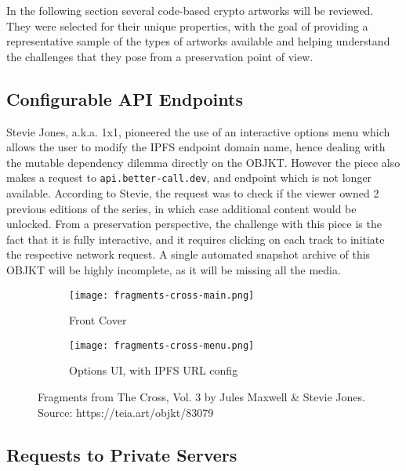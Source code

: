 In the following section several code-based crypto artworks will be reviewed. They were selected for their unique properties, with the goal of providing a representative sample of the types of artworks available and helping understand the challenges that they pose from a preservation point of view.

\subsection{Configurable API Endpoints}

Stevie Jones, a.k.a. 1x1, pioneered the use of an interactive options menu which allows the user to modify the IPFS endpoint domain name, hence dealing with the mutable dependency dilemma directly on the OBJKT. However the piece also makes a request to \texttt{api.better-call.dev}, and endpoint which is not longer available. According to Stevie, the request was to check if the viewer owned 2 previous editions of the series, in which case additional content would be unlocked. From a preservation perspective, the challenge with this piece is the fact that it is fully interactive, and it requires clicking on each track to initiate the respective network request. A single automated snapshot archive of this OBJKT will be highly incomplete, as it will be missing all the media.

\begin{figure}[H]
  \centering
  \captionsetup{justification=centering}
  \begin{subfigure}[b]{0.45\textwidth}
    \centering
    \texttt{[image: fragments-cross-main.png]}
    \caption{Front Cover}
    \label{fig:vdp1}
  \end{subfigure}
  \hfill
  \begin{subfigure}[b]{0.45\textwidth}
    \centering
    \texttt{[image: fragments-cross-menu.png]}
    \caption{Options UI, with IPFS URL config}
    \label{fig:vdp2}
  \end{subfigure}
  \caption[Fragments from The Cross, Vol. 3]{Fragments from The Cross, Vol. 3 by Jules Maxwell \& Stevie Jones. \\ Source: https://teia.art/objkt/83079}
  \label{fig:vdp-examples}
\end{figure}


\subsection{Requests to Private Servers}

